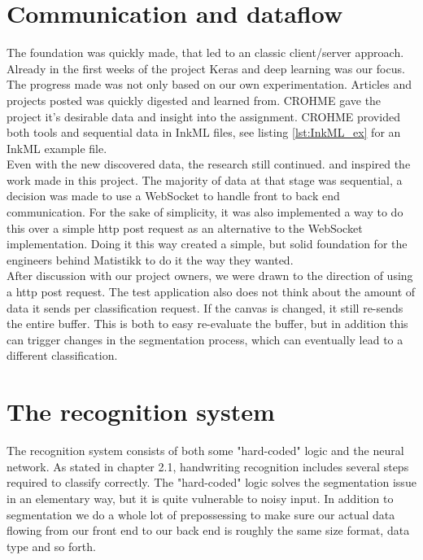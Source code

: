\section{Communication and dataflow}
The foundation was quickly made, that led to an classic client/server approach. Already in the first weeks of the project Keras and deep learning was our focus.%
The progress made was not only based on our own experimentation. Articles and projects posted was quickly digested and learned from. CROHME gave the project it's desirable data and insight into the assignment. CROHME provided both tools and  sequential data in InkML files, see listing \ref{lst:InkML_ex} for an InkML example file.\\
Even with the new discovered data, the research still continued.  \cite{lu_recognition_????} and \cite{thoma_-line_2015} inspired the work made in this project. The majority of data at that stage was sequential, a decision was made to use a \gls{WebSocket} to handle front to back end communication. For the sake of simplicity, it was also implemented a way to do this over a simple http post request as an alternative to the WebSocket implementation. Doing it this way created a simple, but solid foundation for the engineers behind Matistikk to do it the way they wanted. \\
After discussion with our project owners, we were drawn to the direction of using a http post request. The test application also does not think about the amount of data it sends per classification request. If the canvas is changed, it still re-sends the entire buffer. This is both to easy re-evaluate the buffer, but in addition this can trigger changes in the segmentation process, which can eventually lead to a different classification.

\section{The recognition system} %
The recognition system consists of both some "hard-coded" logic and the neural network. As stated in chapter 2.1, handwriting recognition includes several steps required to classify correctly. The "hard-coded" logic solves the segmentation issue in an elementary way, but it is quite vulnerable to noisy input. In addition to segmentation we do a whole lot of prepossessing to make sure our actual data flowing from our front end to our back end is roughly the same size format, data type and so forth. %
